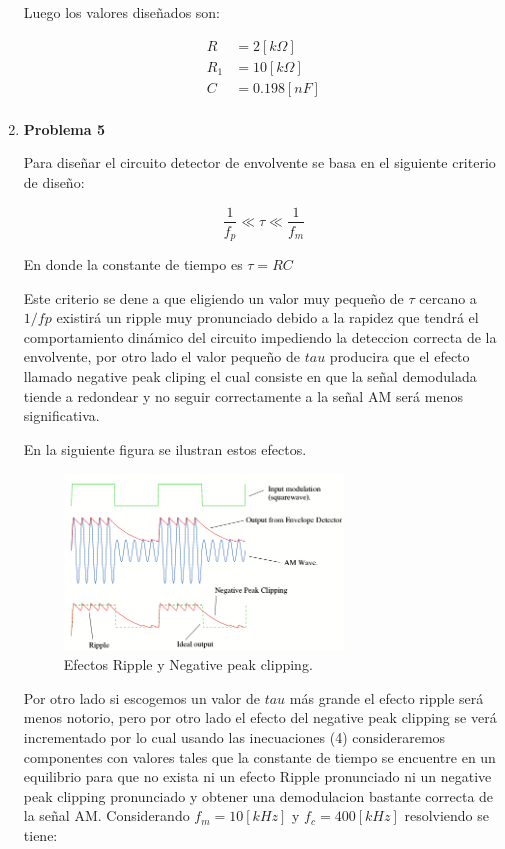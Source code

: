 \documentclass[letterpaper, titlepage]{article}
\begin{document}
\begin{enumerate}
Luego los valores diseñados son:

\begin{align*}
R & = 2[k \Omega] \\
R_{1} & = 10[k \Omega] \\
C & = 0.198[nF] \\
\end{align*}

\newpage

\item \textbf{Problema 5}

Para diseñar el circuito detector de envolvente se basa en el siguiente criterio de diseño:

\begin{equation}
 \frac{1}{f_{p}} \ll \tau \ll \frac{1}{f_{m}}
\end{equation}

En donde la constante de tiempo es $\tau = RC$

Este criterio se dene a que eligiendo un valor muy pequeño de $\tau$ cercano a $1/fp$ existirá un ripple muy pronunciado debido a la rapidez que tendrá el comportamiento dinámico del circuito impediendo la deteccion correcta de la envolvente, por otro lado el valor pequeño de $tau$ producira que el efecto llamado negative peak cliping el cual consiste en que la señal demodulada tiende a redondear y no seguir correctamente a la señal AM será menos significativa.

En la siguiente figura se ilustran estos efectos.	
		
\begin{figure}[H]
  \centering
    \includegraphics[width=0.7\textwidth]{demodulacion1}
  \caption{Efectos Ripple y Negative peak clipping.}
  \label{fig:ejemplo}
\end{figure}


Por otro lado si escogemos un valor de $tau$ más grande el efecto ripple será menos notorio, pero por otro lado el efecto del negative peak clipping se verá incrementado por lo cual usando las inecuaciones (4) consideraremos componentes con valores tales que la constante de tiempo se encuentre en un equilibrio 
para que no exista ni un efecto Ripple pronunciado ni un negative peak clipping pronunciado y obtener una demodulacion bastante correcta de la señal AM.
\newpage
Considerando $ f_{m} = 10[kHz] $ y $ f_{c} = 400[kHz] $ resolviendo se tiene:


\end{enumerate}
\end{document}
